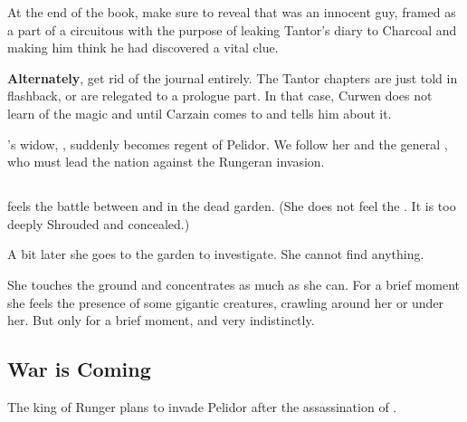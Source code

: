 At the end of the book, make sure to reveal that \Onatol was an innocent guy, framed as a part of a circuitous  with the purpose of leaking Tantor's diary to Charcoal and making him think he had discovered a vital clue. 

\textbf{Alternately}, get rid of the journal entirely.
The Tantor chapters are just told in flashback, or are relegated to a prologue part. 
In that case, Curwen does not learn of the magic and \Takestsha until Carzain comes to \Forclin and tells him about it.

\Icor's widow, \rinyuth[\Tiroco], suddenly becomes regent of Pelidor. 
We follow her and the general , who must lead the nation against the Rungeran invasion. 









\subsection{\MoroCobrel}
\MoroCobrel{} feels the battle between \Ishnaruchaefir{} and \Teshrial{} in the dead garden. 
(She does not feel the \noggyal. It is too deeply Shrouded and concealed.) 

A bit later she goes to the garden to investigate. 
She cannot find anything.

She touches the ground and concentrates as much as she can. 
For a brief moment she feels the presence of some gigantic creatures, crawling around her or under her. 
But only for a brief moment, and very indistinctly. 









\subsection{War is Coming}
The king of Runger plans to invade Pelidor after the assassination of \rayuth[\Icor]. 









